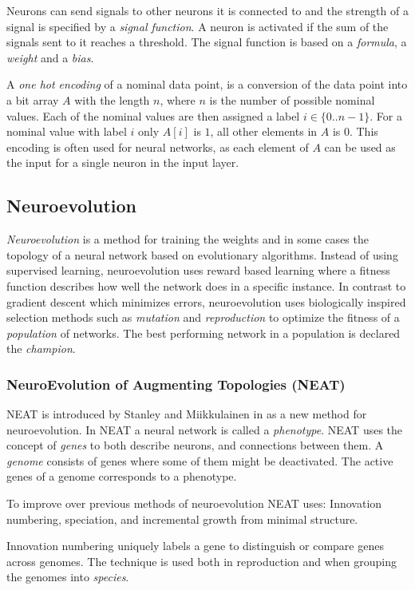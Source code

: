 \newpar Neurons can send signals to other neurons it is connected to and the strength of a signal is specified by a \textit{signal function}. A neuron is activated if the sum of the signals sent to it reaches a threshold. The signal function is based on a \textit{formula}, a \textit{weight} and a \textit{bias}. 

\newpar A \textit{one hot encoding} of a nominal data point, is a conversion of the data point into a bit array $A$ with the length $n$, where $n$ is the number of possible nominal values. Each of the nominal values are then assigned a label $i \in \{0 .. n-1\}$. For a nominal value with label $i$ only $ A[i] $ is $1$, all other elements in $A$ is $0$. This encoding is often used for neural networks, as each element of $A$ can be used as the input for a single neuron in the input layer.

\subsection{Neuroevolution}
\textit{Neuroevolution} is a method for training the weights and in some cases the topology of a neural network based on evolutionary algorithms. Instead of using supervised learning, neuroevolution uses reward based learning where a fitness function describes how well the network does in a specific instance. 
In contrast to gradient descent which minimizes errors, neuroevolution uses biologically inspired selection methods such as \textit{mutation} and \textit{reproduction} to optimize the fitness of a \textit{population} of networks. The best performing network in a population is declared the \textit{champion}.

\subsubsection{NeuroEvolution of Augmenting Topologies (NEAT)}
NEAT is introduced by Stanley and Miikkulainen in \cite{stanley2002evolving} as a new method for neuroevolution. In NEAT a neural network is called a \textit{phenotype}. NEAT uses the concept of \textit{genes} to both describe neurons, and connections between them. A \textit{genome} consists of genes where some of them might be deactivated. The active genes of a genome corresponds to a phenotype. 

\newpar To improve over previous methods of neuroevolution NEAT uses: Innovation numbering, speciation, and incremental growth from minimal structure.

\newpar Innovation numbering uniquely labels a gene to distinguish or compare genes across genomes. The technique is used both in reproduction and when grouping the genomes into \textit{species}.

